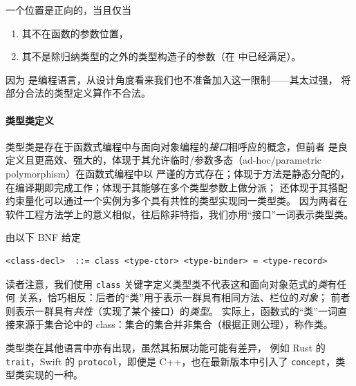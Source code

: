 \begin{definition}[正向位置]
  一个位置是正向的，当且仅当
  \vspace{-1em}
\begin{enumerate}\itemsep0em
    \item 其不在函数的参数位置，
    \item 其不是除归纳类型的之外的类型构造子的参数（在 \Tigris 中已经满足）。
  \end{enumerate}
  因为 \Tigris 是编程语言，从设计角度看来我们也不准备加入这一限制——其太过强，
  将部分合法的类型定义算作不合法。
\end{definition}
\paragraph{类型类定义} 类型类是存在于函数式编程中与面向对象编程的\emph{接口}相呼应的概念，但前者
是良定义且更高效、强大的，体现于其允许临时/参数多态（ad-hoc/parametric polymorphism）在函数式编程中以
严谨的方式存在；体现于方法是静态分配的，在编译期即完成工作；体现于其能够在多个类型参数上做分派；
还体现于其搭配约束量化可以通过一个实例为多个具有共性的类型实现同一类型类。
因为两者在软件工程方法学上的意义相似，往后除非特指，我们亦用“接口”一词表示类型类。
\begin{definition}[类型类声明] 由以下 BNF 给定
\begin{verbatim}
<class-decl>  ::= class <type-ctor> <type-binder> = <type-record>
\end{verbatim}
\end{definition}
读者注意，我们使用 \texttt{class} 关键字定义类型类不代表这和面向对象范式的\emph{类}有任何
关系，恰巧相反：后者的“类”用于表示一群具有相同方法、栏位的\emph{对象}；
前者则表示一群具有\emph{共性}（实现了某个接口）的\emph{类型}。
实际上，函数式的“类”一词直接来源于集合论中的 class：集合的集合并非集合（根据正则公理），称作类。

类型类在其他语言中亦有出现，虽然其拓展功能可能有差异，
例如 Rust 的 \texttt{trait}，Swift 的 \texttt{protocol}，即便是 C++，也在最新版本中引入了
\texttt{concept}，类型类实现的一种。

